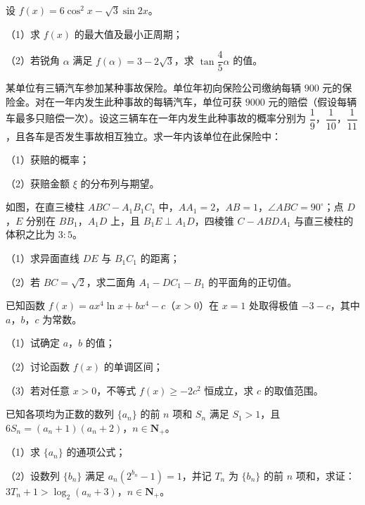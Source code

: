 \begin{question}
设 $f(x)=6\cos^2x-\sqrt3\sin2x$。

（1）求 $f(x)$ 的最大值及最小正周期；

（2）若锐角 $\alpha$ 满足 $f(\alpha)=3-2\sqrt3$，求 $\tan\dfrac45\alpha$ 的值。

\end{question}
\begin{question}
某单位有三辆汽车参加某种事故保险。单位年初向保险公司缴纳每辆 $900$ 元的保险金。对在一年内发生此种事故的每辆汽车，单位可获 $9000$ 元的赔偿（假设每辆车最多只赔偿一次）。设这三辆车在一年内发生此种事故的概率分别为 $\dfrac19$，$\dfrac1{10}$，$\dfrac1{11}$，且各车是否发生事故相互独立。求一年内该单位在此保险中：

（1）获赔的概率；

（2）获赔金额 $\xi$ 的分布列与期望。

\Needspace{0.4\textheight}
\end{question}
\begin{question}
如图，在直三棱柱 $ABC-A_1B_1C_1$ 中，$AA_1=2$，$AB=1$，$\angle ABC=90^\circ$；点 $D$，$E$ 分别在 $BB_1$，$A_1D$ 上，且 $B_1E\perp A_1D$，四棱锥 $C-ABDA_1$ 与直三棱柱的体积之比为 $3:5$。

（1）求异面直线 $DE$ 与 $B_1C_1$ 的距离；

（2）若 $BC=\sqrt2$，求二面角 $A_1-DC_1-B_1$ 的平面角的正切值。
\nopagebreak[4]
\begin{center}\end{center}
\nopagebreak[4]
\end{question}
\begin{question}
已知函数 $f(x)=ax^4\ln x+bx^4-c$（$x>0$）在 $x=1$ 处取得极值 $-3-c$，其中 $a$，$b$，$c$ 为常数。

（1）试确定 $a$，$b$ 的值；

（2）讨论函数 $f(x)$ 的单调区间；

（3）若对任意 $x>0$，不等式 $f(x)\geqslant-2c^2$ 恒成立，求 $c$ 的取值范围。

\end{question}
\begin{question}
已知各项均为正数的数列 $\{a_n\}$ 的前 $n$ 项和 $S_n$ 满足 $S_1>1$，且 $6S_n=(a_n+1)(a_n+2)$，$n\in\mathbf N_+$。

（1）求 $\{a_n\}$ 的通项公式；

（2）设数列 $\{b_n\}$ 满足 $a_n(2^{b_n}-1)=1$，并记 $T_n$ 为 $\{b_n\}$ 的前 $n$ 项和，求证：$3T_n+1>\log_2(a_n+3)$，$n\in\mathbf N_+$。

\Needspace{0.4\textheight}
\end{question}
